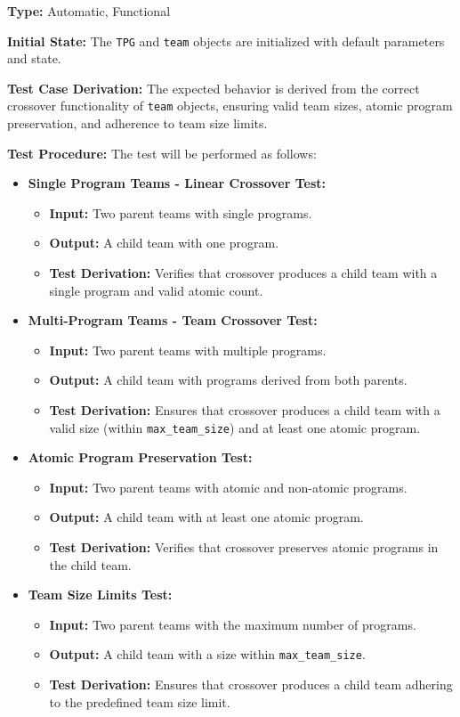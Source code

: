 \documentclass[12pt, titlepage]{article}
\begin{document}
\textbf{Type:} Automatic, Functional

\textbf{Initial State:} The \texttt{TPG} and \texttt{team} objects are initialized with default parameters and state.

\textbf{Test Case Derivation:} The expected behavior is derived from the correct crossover functionality of \texttt{team} objects, ensuring valid team sizes, atomic program preservation, and adherence to team size limits.

\textbf{Test Procedure:} The test will be performed as follows:
\begin{itemize}
    \item \textbf{Single Program Teams - Linear Crossover Test:}
    \begin{itemize}
        \item \textbf{Input:} Two parent teams with single programs.
        \item \textbf{Output:} A child team with one program.
        \item \textbf{Test Derivation:} Verifies that crossover produces a child team with a single program and valid atomic count.
    \end{itemize}

    \item \textbf{Multi-Program Teams - Team Crossover Test:}
    \begin{itemize}
        \item \textbf{Input:} Two parent teams with multiple programs.
        \item \textbf{Output:} A child team with programs derived from both parents.
        \item \textbf{Test Derivation:} Ensures that crossover produces a child team with a valid size (within \texttt{max\_team\_size}) and at least one atomic program.
    \end{itemize}

    \item \textbf{Atomic Program Preservation Test:}
    \begin{itemize}
        \item \textbf{Input:} Two parent teams with atomic and non-atomic programs.
        \item \textbf{Output:} A child team with at least one atomic program.
        \item \textbf{Test Derivation:} Verifies that crossover preserves atomic programs in the child team.
    \end{itemize}

    \item \textbf{Team Size Limits Test:}
    \begin{itemize}
        \item \textbf{Input:} Two parent teams with the maximum number of programs.
        \item \textbf{Output:} A child team with a size within \texttt{max\_team\_size}.
        \item \textbf{Test Derivation:} Ensures that crossover produces a child team adhering to the predefined team size limit.
    \end{itemize}
\end{itemize}
\end{document}
